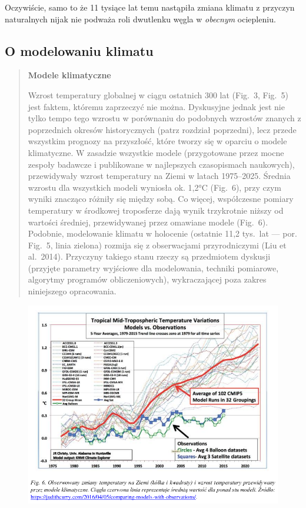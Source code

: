 \documentclass[12pt]{article}
\begin{document}
Oczywiście, samo to że 11 tysiące lat temu nastąpiła zmiana klimatu z przyczyn naturalnych nijak nie podważa roli dwutlenku węgla w \emph{obecnym} ociepleniu.

\newpage

\subsection*{O modelowaniu klimatu}

\begin{quotation}
	\textbf{Modele klimatyczne}
	
	Wzrost temperatury globalnej w ciągu ostatnich 300 lat (Fig.~3, Fig.~5) jest faktem, któremu zaprzeczyć nie można. Dyskusyjne jednak jest nie tylko tempo tego wzrostu w porównaniu do podobnych wzrostów znanych z poprzednich okresów historycznych (patrz rozdział poprzedni), lecz przede wszystkim prognozy na przyszłość, które tworzy się w oparciu o modele klimatyczne. W zasadzie wszystkie modele (przygotowane przez mocne zespoły badawcze i publikowane w najlepszych czasopismach naukowych), przewidywały wzrost temperatury na Ziemi w latach 1975--2025. Średnia wzrostu dla wszystkich modeli wyniosła ok. 1{,}2\si{\celsius} (Fig.~6), przy czym wyniki znacząco różniły się między sobą. Co więcej, współczesne pomiary temperatury w środkowej troposferze dają wynik trzykrotnie niższy od wartości średniej, przewidywanej przez omawiane  modele (Fig.~6). Podobnie, modelowanie klimatu w holocenie (ostatnie 11{,}2 tys.~lat --- por. Fig.~5, linia zielona) rozmija się z obserwacjami przyrodniczymi (Liu et al.~2014). Przyczyny takiego stanu rzeczy są przedmiotem dyskusji (przyjęte parametry wyjściowe dla modelowania, techniki pomiarowe, algorytmy programów obliczeniowych), wykraczającej poza zakres niniejszego opracowania.
\end{quotation}

\begin{figure}
	\centering
	\includegraphics[width=.95\textwidth]{img/kng4.png}	
\end{figure}
\end{document}
